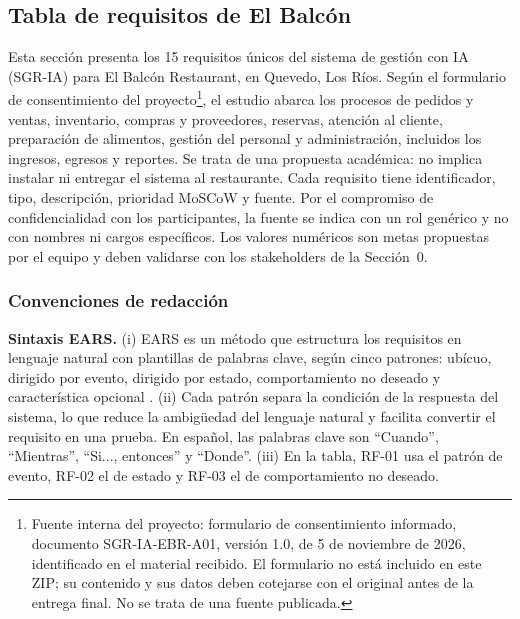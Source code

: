 \subsection{Tabla de requisitos de El Balc\'on}

Esta secci\'on presenta los 15 requisitos \'unicos del sistema de gesti\'on con IA (SGR-IA) para El Balc\'on Restaurant, en Quevedo, Los R\'ios. Seg\'un el formulario de consentimiento del proyecto\footnote{Fuente interna del proyecto: formulario de consentimiento informado, documento SGR-IA-EBR-A01, versi\'on 1.0, de 5 de noviembre de 2026, identificado en el material recibido. El formulario no est\'a incluido en este ZIP; su contenido y sus datos deben cotejarse con el original antes de la entrega final. No se trata de una fuente publicada.}, el estudio abarca los procesos de pedidos y ventas, inventario, compras y proveedores, reservas, atenci\'on al cliente, preparaci\'on de alimentos, gesti\'on del personal y administraci\'on, incluidos los ingresos, egresos y reportes. Se trata de una propuesta acad\'emica: no implica instalar ni entregar el sistema al restaurante. Cada requisito tiene identificador, tipo, descripci\'on, prioridad MoSCoW y fuente. Por el compromiso de confidencialidad con los participantes, la fuente se indica con un rol gen\'erico y no con nombres ni cargos espec\'ificos. Los valores num\'ericos son metas propuestas por el equipo y deben validarse con los stakeholders de la Secci\'on~0.

\subsubsection{Convenciones de redacci\'on}
\textbf{Sintaxis EARS.} (i) EARS es un m\'etodo que estructura los requisitos en lenguaje natural con plantillas de palabras clave, seg\'un cinco patrones: ub\'icuo, dirigido por evento, dirigido por estado, comportamiento no deseado y caracter\'istica opcional \cite{mavin2009}. (ii) Cada patr\'on separa la condici\'on de la respuesta del sistema, lo que reduce la ambig\"uedad del lenguaje natural y facilita convertir el requisito en una prueba. En espa\~nol, las palabras clave son ``Cuando'', ``Mientras'', ``Si..., entonces'' y ``Donde''. (iii) En la tabla, RF-01 usa el patr\'on de evento, RF-02 el de estado y RF-03 el de comportamiento no deseado.

